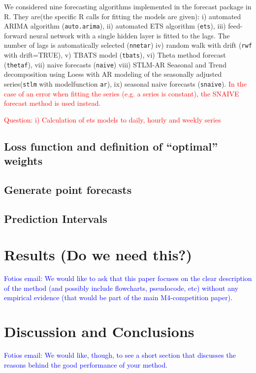 \documentclass[11pt,a4paper,]{article}
\theoremstyle{definition}
\theoremstyle{definition}
\theoremstyle{definition}
\theoremstyle{remark}
\begin{document}
We considered nine forecasting algorithms implemented in the forecast
package in R. They are(the specific R calls for fitting the models are
given): i) automated ARIMA algorithm (\texttt{auto.arima}), ii)
automated ETS algorithm (\texttt{ets}), iii) feed-forward neural network
with a single hidden layer is fitted to the lags. The number of lags is
automatically selected (\texttt{nnetar}) iv) random walk with drift
(\texttt{rwf} with drift=TRUE), v) TBATS model (\texttt{tbats}), vi)
Theta method forecast (\texttt{thetaf}), vii) naive forecasts
(\texttt{naive}) viii) STLM-AR Seasonal and Trend decomposition using
Loess with AR modeling of the seasonally adjusted series(\texttt{stlm}
with modelfunction \texttt{ar}), ix) seasonal naive forecasts
(\texttt{snaive}).
\textcolor{red}{In the case of an error when fitting the series (e.g. a series is constant), the SNAIVE forecast method is used instead.}

\textcolor{red}{Question: i) Calculation of ets models to daily, hourly and weekly series}

\subsection{\texorpdfstring{Loss function and definition of ``optimal''
weights}{Loss function and definition of optimal weights}}\label{loss-function-and-definition-of-optimal-weights}

\subsection{Generate point forecasts}\label{generate-point-forecasts}

\subsection{Prediction Intervals}\label{prediction-intervals}

\section{Results (Do we need this?)}\label{results-do-we-need-this}

\textcolor{blue}{ Fotios email: We would like to ask that this paper focuses on the clear description of the method (and possibly include flowcharts, pseudocode, etc) without any empirical evidence (that would be part of the main M4-competition paper). }

\section{Discussion and Conclusions}\label{discussion-and-conclusions}

\textcolor{blue}{Fotios email: We would like, though, to see a short section that discusses the reasons behind the good performance of your method. }

\printbibliography[title=References]
\end{document}

